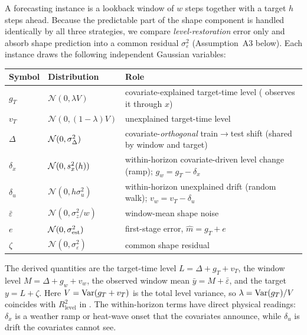 A forecasting instance is a lookback window of $w$ steps together with a target $h$ steps ahead. Because the predictable part of the shape component is handled identically by all three strategies, we compare \emph{level-restoration} error only and absorb shape prediction into a common residual $\sigma_\varepsilon^2$ (Assumption~A3 below). Each instance draws the following independent Gaussian variables:

\begin{center}
\begin{tabular}{@{}llp{7.6cm}@{}}
\toprule
Symbol & Distribution & Role \\
\midrule
$g_T$ & $\mathcal{N}(0,\lambda V)$ & covariate-explained target-time level (\cnm{} observes it through $x$) \\
$v_T$ & $\mathcal{N}(0,(1-\lambda)V)$ & unexplained target-time level \\
$\Delta$ & $\mathcal{N}(0,\sigma_\Delta^2)$ & covariate-\emph{orthogonal} train$\to$test shift (shared by window and target) \\
$\delta_x$ & $\mathcal{N}(0,s_x^2(h))$ & within-horizon covariate-driven level change (ramp); $g_w = g_T - \delta_x$ \\
$\delta_u$ & $\mathcal{N}(0,h\sigma_u^2)$ & within-horizon unexplained drift (random walk); $v_w = v_T - \delta_u$ \\
$\bar\varepsilon$ & $\mathcal{N}(0,\sigma_z^2/w)$ & window-mean shape noise \\
$e$ & $\mathcal{N}(0,\sigma_{\mathrm{est}}^2)$ & \cnm{} first-stage error, $\hat m = g_T + e$ \\
$\zeta$ & $\mathcal{N}(0,\sigma_\varepsilon^2)$ & common shape residual \\
\bottomrule
\end{tabular}
\end{center}

\noindent The derived quantities are the target-time level $L = \Delta + g_T + v_T$, the window level $M = \Delta + g_w + v_w$, the observed window mean $\bar y = M + \bar\varepsilon$, and the target $y = L + \zeta$. Here $V = \mathrm{Var}(g_T + v_T)$ is the total level variance, so $\lambda = \mathrm{Var}(g_T)/V$ coincides with $R^2_{\mathrm{level}}$ in . The within-horizon terms have direct physical readings: $\delta_x$ is a weather ramp or heat-wave onset that the covariates announce, while $\delta_u$ is drift the covariates cannot see.

